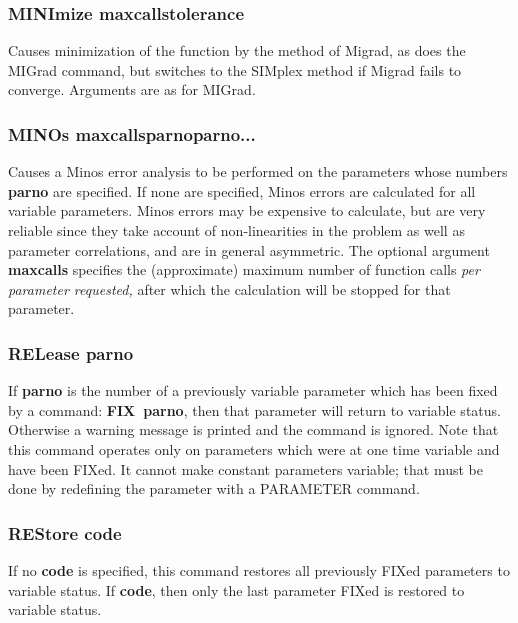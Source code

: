 \subsubsection*{MINImize  \lsb maxcalls\rsb  \lsb tolerance\rsb }

Causes minimization of the function by the method of Migrad,
as does the MIGrad command, but switches to the SIMplex method
if Migrad fails to converge. Arguments are as for MIGrad.

\subsubsection*{MINOs   \lsb maxcalls\rsb   \lsb parno\rsb  \lsb parno\rsb  ...}

Causes a Minos error analysis to be performed on the parameters whose
numbers {\bf \lsb parno\rsb } are specified.
If none are specified, Minos errors
are calculated for all variable parameters.
Minos errors may be expensive to calculate, but are very reliable since
they take account of non-linearities in the problem as well as
parameter correlations, and are in general asymmetric.
The optional argument {\bf \lsb maxcalls\rsb } specifies the (approximate) maximum
number of function calls {\it per parameter requested,}
after which the calculation will be stopped for that parameter.

\subsubsection*{RELease  parno}

If {\bf parno} is the number of a previously variable parameter which has
been fixed by a command:
{\bf FIX~parno}, then that parameter will
return to variable status.  Otherwise a warning message is printed
and the command is ignored.
Note that this command operates only on parameters which were at one time
variable and have been FIXed.
It cannot make constant parameters variable;
that must be done by redefining the parameter with a PARAMETER command.

\subsubsection*{REStore  \lsb code\rsb }

If no {\bf \lsb code\rsb } is specified, this command restores all previously FIXed
parameters to variable status. If {\bf \lsb code},
then only the last parameter FIXed is restored to variable status.

